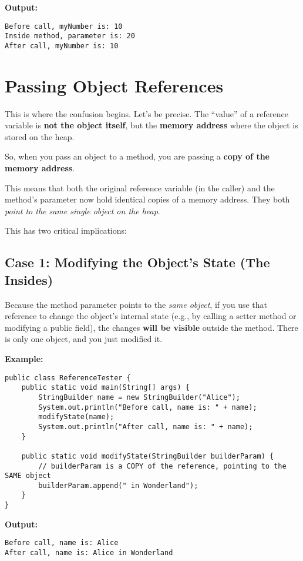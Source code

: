 \documentclass[12pt]{article}
\begin{document}
\begin{enumerate}[label=(\arabic*)]
\textbf{Output:}
\begin{verbatim}
Before call, myNumber is: 10
Inside method, parameter is: 20
After call, myNumber is: 10
\end{verbatim}

\section{Passing Object References}
This is where the confusion begins. Let's be precise. The ``value'' of a reference variable is \textbf{not the object itself}, but the \textbf{memory address} where the object is stored on the heap. 

So, when you pass an object to a method, you are passing a \textbf{copy of the memory address}.

This means that both the original reference variable (in the caller) and the method's parameter now hold identical copies of a memory address. They both \textit{point to the same single object on the heap}.

This has two critical implications:

\subsection{Case 1: Modifying the Object's State (The Insides)}
Because the method parameter points to the \textit{same object}, if you use that reference to change the object's internal state (e.g., by calling a setter method or modifying a public field), the changes \textbf{will be visible} outside the method. There is only one object, and you just modified it.

\textbf{Example:}
\begin{verbatim}
public class ReferenceTester {
    public static void main(String[] args) {
        StringBuilder name = new StringBuilder("Alice");
        System.out.println("Before call, name is: " + name);
        modifyState(name);
        System.out.println("After call, name is: " + name);
    }

    public static void modifyState(StringBuilder builderParam) {
        // builderParam is a COPY of the reference, pointing to the SAME object
        builderParam.append(" in Wonderland");
    }
}
\end{verbatim}
\textbf{Output:}
\begin{verbatim}
Before call, name is: Alice
After call, name is: Alice in Wonderland
\end{verbatim}


\end{enumerate}
\end{document}
